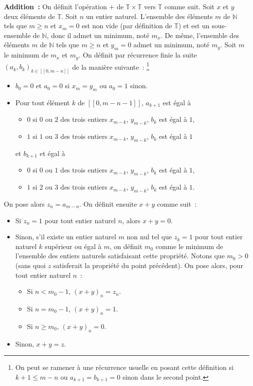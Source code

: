 \medskip

\noindent\textbf{Addition :} On définit l'opération $+$ de $\mathbb{T} \times \mathbb{T}$ vers $\mathbb{T}$ comme suit. 
    Soit $x$ et $y$ deux éléments de $\mathbb{T}$.
    Soit $n$ un entier naturel. 
    L'ensemble des éléments $m$ de $\mathbb{N}$ tels que $m \geq n$ et $x_m = 0$ est non vide (par définition de $\mathbb{T}$) et est un sous-ensemble de $\mathbb{N}$, donc il admet un minimum, noté $m_x$. 
    De même, l'ensemble des éléments $m$ de $\mathbb{N}$ tels que $m \geq n$ et $y_m = 0$ admet un minimum, noté $m_y$. 
    Soit $m$ le minimum de $m_x$ et $m_y$. 
    On définit par récurrence finie la suite $(a_k, b_k)_{k \in [\![0, m-n]\!]}$ de la manière suivante :%
    \footnote{On peut se ramener à une récurrence usuelle en posant cette définition si $k + 1 \leq m-n$ ou $a_{k+1} = b_{k+1} = 0$ sinon dans le second point.}
    \begin{itemize}[nosep]
        \item $b_0 = 0$ et $a_0 = 0$ si $x_m = y_m$ ou $a_0 = 1$ sinon.
        \item Pour tout élément $k$ de $[\![0, m-n-1]\!]$, $a_{k+1}$ est égal à 
            \begin{itemize}[nosep]
                \item $0$ si $0$ ou $2$ des trois entiers $x_{m-k}$, $y_{m-k}$, $b_k$ est égal à $1$,
                \item $1$ si $1$ ou $3$ des trois entiers $x_{m-k}$, $y_{m-k}$, $b_k$ est égal à $1$
            \end{itemize}
            et $b_{k+1}$ et égal à 
            \begin{itemize}[nosep]
                \item $0$ si $0$ ou $1$ des trois entiers $x_{m-k}$, $y_{m-k}$, $b_k$ est égal à $1$,
                \item $1$ si $2$ ou $3$ des trois entiers $x_{m-k}$, $y_{m-k}$, $b_k$ est égal à $1$.
            \end{itemize}
    \end{itemize}
    On pose alors $z_n = a_{m-n}$.
    On définit ensuite $x + y$ comme suit : 
    \begin{itemize}[nosep]
        \item Si $z_n = 1$ pour tout entier naturel $n$, alors $x + y = 0$.
        \item Sinon, s'il existe un entier naturel $m$ non nul tel que $z_k = 1$ pour tout entier naturel $k$ supérieur ou égal à $m$, on définit $m_0$ comme le minimum de l'ensemble des entiers naturels satisfaisant cette propriété. 
            Notons que $m_0 > 0$ (sans quoi $z$ satisferait la propriété du point précédent).
            On pose alors, pour tout entier naturel $n$ : 
            \begin{itemize}[nosep]
                \item Si $n < m_0 - 1$, $(x+y)_n = z_n$.
                \item Si $n = m_0 - 1$, $(x+y)_n = 1$.
                \item Si $n \geq m_0$, $(x+y)_n = 0$.
            \end{itemize}
        \item Sinon, $x + y = z$.
    \end{itemize}
